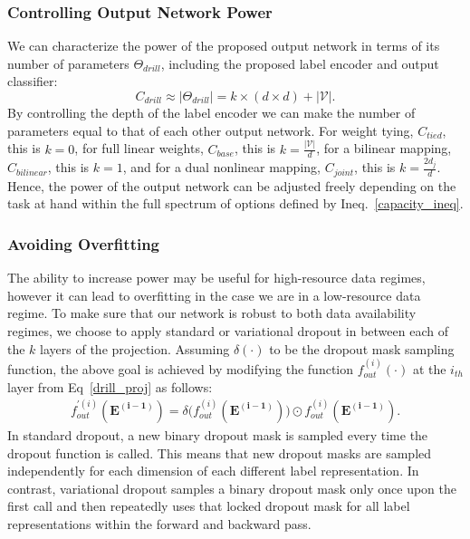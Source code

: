 \documentclass{article}
\begin{document}
\subsubsection{Controlling Output Network Power}
We can characterize the power of the proposed output network in terms of its number of parameters $\Theta_{drill}$,  including the proposed label encoder and output classifier:
\begin{equation}
    C_{drill} \approx |\Theta_{drill}| = k \times (d \times d) + |\mathcal{V}|.
\end{equation}
By controlling the depth of the label encoder we can make the number of parameters equal to that of each other output network.  For weight tying, $C_{tied}$, this is $k=0$, for full linear weights, $C_{base}$, this is $k=\frac{|\mathcal{V}|}{d}$, for a bilinear mapping, $C_{bilinear}$, this is $k=1$, and for a dual nonlinear mapping, $C_{joint}$, this is $k=\frac{2d_j}{d}$.  Hence, the power of the output network can be adjusted freely depending on the task at hand within the full spectrum of options defined by Ineq.~\ref{capacity_ineq}. 

\subsubsection{Avoiding Overfitting}
The ability to increase power may be useful for high-resource data regimes, however it can lead to overfitting in the case we are in a low-resource data regime. To make sure that our network is robust to both data availability regimes, we choose to apply standard \cite{dropout15} or variational \cite{vardropout16} dropout in between each of the $k$ layers of the projection.  Assuming $\delta(\cdot)$ to be the dropout mask sampling function, the above goal is achieved by modifying the function $f^{(i)}_{out}(\cdot)$ at the $i_{th}$ layer from Eq~\ref{drill_proj} as follows:
\begin{align}
    f^{\prime(i)}_{out}(\mathbf{E^{(i-1)}}) = \delta\big( f^{(i)}_{out}(\mathbf{E^{(i-1)}}) \big) \odot f^{(i)}_{out}(\mathbf{E^{(i-1)}}).
\end{align}   
In standard dropout, a new binary dropout mask is sampled every time the dropout function is called. This means that new dropout masks are sampled independently for each dimension of each different label representation. In contrast, variational dropout samples a binary dropout mask only once upon the first call and then repeatedly uses that locked dropout mask for all label representations within the forward and backward pass.
\end{document}
